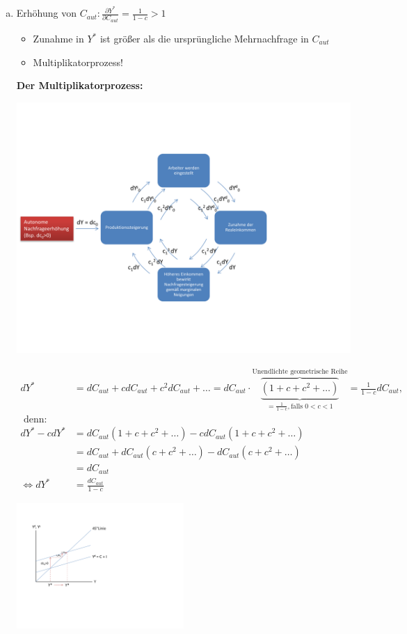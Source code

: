 \documentclass{scrartcl}
\begin{document}
\begin{enumerate}[(a)]
\item Erh\"{o}hung von $C_{aut}: \frac{\partial Y^*}{\partial C_{aut}}=\frac{1}{1-c}>1$
  \begin{itemize}
    \item Zunahme in $Y^*$ ist gr\"{o}{\ss}er als die urspr\"{u}ngliche Mehrnachfrage in $C_{aut}$
    \item Multiplikatorprozess!
  \end{itemize}

\textbf{Der Multiplikatorprozess:}
\begin{center}
  \includegraphics[width=\textwidth]{Bilder/Keynes_Multiplikator.pdf}
\end{center}
\begin{align*}
  d Y^* &= d C_{aut} + c d C_{aut} + c^2 d C_{aut} + \dots = d C_{aut} \cdot \overbrace{\underbrace{(1 + c + c^2+ \dots)}}_{=\frac{1}{1-c}, \text{falls } 0<c<1}^\text{Unendlichte geometrische Reihe}= \frac{1}{1-c}dC_{aut}, \\\text{ denn:}&\\
  d Y^* - c d Y^* &= d C_{aut}(1 + c + c^2+ \dots) - c d C_{aut}(1 + c + c^2+ \dots) \\
  &= d C_{aut} + d C_{aut}(c + c^2+ \dots) - d C_{aut}(c + c^2+ \dots) \\
  &= d C_{aut}\\
  \Leftrightarrow d Y^* &= \frac{d C_{aut}}{1-c}
\end{align*}
\begin{center}
  \includegraphics[width=0.5\textwidth]{Bilder/Keynes_Multiplikator_Grafisch.pdf}
\end{center}
\end{enumerate}
\end{document}
